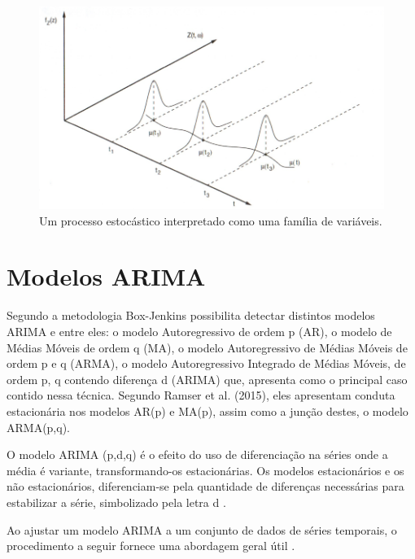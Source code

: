 \documentclass[
	12pt,				%
	openright,			%
	oneside,      %
	a4paper,			%
	english,			%
	french,				%
	spanish,			%
	brazil,				%
	]{abntex2}\usepackage[]{graphicx}\usepackage[table]{xcolor}
\theoremstyle{definition}
\theoremstyle{remark}
\begin{document}
\begin{figure}
  \caption{\label{img3}Um processo estocástico interpretado como uma família de variáveis.}
    \begin{center}
      \includegraphics[scale = 0.9]{image/img3.png}
    \end{center}
\end{figure}

  
  \section{Modelos ARIMA}
  
Segundo \cite{martins2014comparison} a metodologia Box-Jenkins possibilita detectar distintos modelos ARIMA e entre eles: o modelo Autoregressivo de ordem p (AR), o modelo de Médias Móveis de ordem q (MA), o modelo Autoregressivo de Médias Móveis de ordem p e q (ARMA), o modelo Autoregressivo Integrado de Médias Móveis, de ordem p, q contendo diferença d (ARIMA) que, apresenta como o principal caso contido nessa técnica. Segundo Ramser et al. (2015), eles apresentam conduta estacionária nos modelos AR(p) e MA(p), assim como a junção destes, o modelo ARMA(p,q).

O modelo ARIMA (p,d,q) é o efeito do uso de diferenciação na séries onde a média é variante,
transformando-os estacionárias. Os modelos estacionários e os não estacionários, diferenciam-se
pela quantidade de diferenças necessárias para estabilizar a série, simbolizado pela letra d \cite{martins2014comparison}.

Ao ajustar um modelo ARIMA a um conjunto de dados de séries temporais, o procedimento a seguir fornece uma abordagem geral útil \cite{hyndman2018forecasting}.
\end{document}

